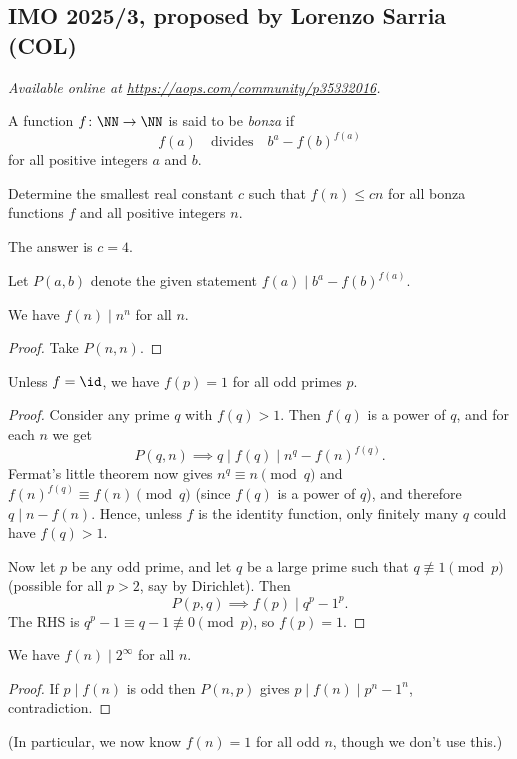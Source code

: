 \documentclass[11pt]{scrartcl}
\begin{document}
\subsection{IMO 2025/3, proposed by Lorenzo Sarria (COL)}
\textsl{Available online at \url{https://aops.com/community/p35332016}.}
\begin{mdframed}[style=mdpurplebox,frametitle={Problem statement}]
A function $f \colon \NN \to \NN$ is said to be \emph{bonza} if
\[ f(a)\quad\text{divides}\quad b^a-f(b)^{f(a)} \]
for all positive integers $a$ and $b$.

Determine the smallest real constant $c$ such that $f(n) \leq cn$
for all bonza functions $f$ and all positive integers $n$.
\end{mdframed}
The answer is $c=4$.

Let $P(a,b)$ denote the given statement $f(a) \mid b^a - f(b)^{f(a)}$.
\begin{claim*}
  We have $f(n) \mid n^n$ for all $n$.
\end{claim*}
\begin{proof}
  Take $P(n,n)$.
\end{proof}

\begin{claim*}
  Unless $f = \id$, we have $f(p) = 1$ for all odd primes $p$.
\end{claim*}
\begin{proof}
  Consider any prime $q$ with $f(q) > 1$.
  Then $f(q)$ is a power of $q$, and for each $n$ we get
  \[ P(q,n) \implies q \mid f(q) \mid n^q - f(n)^{f(q)}. \]
  Fermat's little theorem now gives
  $n^q \equiv n \pmod q$ and $f(n)^{f(q)} \equiv f(n) \pmod q$
  (since $f(q)$ is a power of $q$), and therefore $q \mid n - f(n)$.
  Hence, unless $f$ is the identity function,
  only finitely many $q$ could have $f(q) > 1$.

  Now let $p$ be any odd prime,
  and let $q$ be a large prime such that $q \not\equiv 1 \pmod p$
  (possible for all $p > 2$, say by Dirichlet).
  Then
  \[ P(p,q) \implies f(p) \mid q^p - 1^p. \]
  The RHS is $q^p - 1 \equiv q - 1 \not\equiv 0 \pmod p$, so $f(p) = 1$.
\end{proof}

\begin{claim*}
  We have $f(n) \mid 2^\infty$ for all $n$.
\end{claim*}
\begin{proof}
  If $p \mid f(n)$ is odd then $P(n,p)$ gives $p \mid f(n) \mid p^n-1^n$,
  contradiction.
\end{proof}
(In particular, we now know $f(n) = 1$ for all odd $n$, though we don't use this.)
\end{document}
